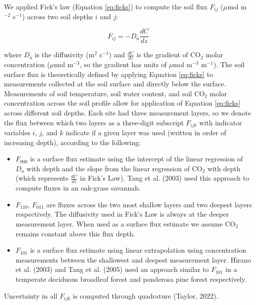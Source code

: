 \documentclass[
  letterpaper,
  DIV=11,
  numbers=noendperiod]{scrartcl}
\providecommand{\tightlist}{%
  \setlength{\itemsep}{0pt}\setlength{\parskip}{0pt}}\usepackage{longtable,booktabs,array}
\begin{document}
We applied Fick's law (Equation \ref{eq:ficks}) to compute the soil flux
\(F_{ij}\) (\(\mu\)mol m\(^{-2}\) s\(^{-1}\)) across two soil depths
\(i\) and \(j\):

\begin{equation}
  F_{ij} = -D_{a} \frac{dC}{dz}
  \label{eq:ficks}
\end{equation}

where \(D_{a}\) is the diffusivity (m\(^{2}\) s\(^{-1}\)) and
\(\frac{dC}{dz}\) is the gradient of CO\(_{2}\) molar concentration
(\(\mu\)mol m\(^{-3}\), so the gradient has units of \(\mu\)mol
m\(^{-3}\) m\(^{-1}\)). The soil surface flux is theoretically defined
by applying Equation \ref{eq:ficks} to measurements collected at the
soil surface and directly below the surface. Measurements of soil
temperature, soil water content, and soil CO\(_{2}\) molar concentration
across the soil profile allow for application of Equation \ref{eq:ficks}
across different soil depths. Each site had three measurement layers, so
we denote the flux between which two layers as a three-digit subscript
\(F_{ijk}\) with indicator variables \(i\), \(j\), and \(k\) indicate if
a given layer was used (written in order of increasing depth), according
to the following:

\begin{itemize}
\tightlist
\item
  \(F_{000}\) is a surface flux estimate using the intercept of the
  linear regression of \(D_{a}\) with depth and the slope from the
  linear regression of CO\(_{2}\) with depth (which represents
  \(\displaystyle \frac{dC}{dz}\) in Fick's Law). Tang et al. (2003)
  used this approach to compute fluxes in an oak-grass savannah.
\item
  \(F_{110}\), \(F_{011}\) are fluxes across the two most shallow layers
  and two deepest layers respectively. The diffusivity used in Fick's
  Law is always at the deeper measurement layer. When used as a surface
  flux estimate we assume CO\(_{2}\) remains constant above this flux
  depth.
\item
  \(F_{101}\) is a surface flux estimate using linear extrapolation
  using concentration measurements between the shallowest and deepest
  measurement layer. Hirano et al. (2003) and Tang et al. (2005) used an
  approach similar to \(F_{101}\) in a temperate deciduous broadleaf
  forest and ponderosa pine forest respectively.
\end{itemize}

Uncertainty in all \(F_{ijk}\) is computed through quadrature (Taylor,
2022).
\end{document}
